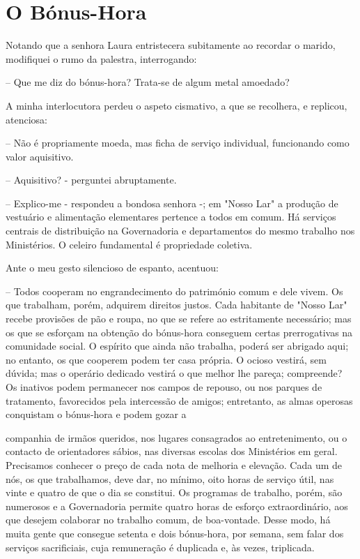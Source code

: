 \documentclass[portuguese,12pt,a4paper]{scrbook}
\begin{document}
	
	\chapter{O Bónus-Hora}
	
	Notando que a senhora Laura entristecera subitamente ao recordar o marido, modifiquei o rumo da palestra, interrogando:
	
	– Que me diz do bónus-hora? Trata-se de algum metal amoedado?
	
	A minha interlocutora perdeu o aspeto cismativo, a que se recolhera, e replicou, atenciosa:
	
	– Não é propriamente moeda, mas ficha de serviço individual, funcionando como valor aquisitivo.
	
	– Aquisitivo? - perguntei abruptamente.
	
	– Explico-me - respondeu a bondosa senhora -; em "Nosso Lar" a produção de vestuário e alimentação elementares pertence a todos em comum. Há serviços centrais de distribuição na Governadoria e departamentos do mesmo trabalho nos Ministérios. O celeiro fundamental é propriedade coletiva.
	
	Ante o meu gesto silencioso de espanto, acentuou:
	
	– Todos cooperam no engrandecimento do património comum e dele vivem. Os que trabalham, porém, adquirem direitos justos. Cada habitante de "Nosso Lar" recebe provisões de pão e roupa, no que se refere ao estritamente necessário; mas os que se esforçam na obtenção do bónus-hora conseguem certas prerrogativas na comunidade social. O espírito que ainda não trabalha, poderá ser abrigado aqui; no entanto, os que cooperem podem ter casa própria. O ocioso vestirá, sem dúvida; mas o operário dedicado vestirá o que melhor lhe pareça; compreende? Os inativos podem permanecer nos campos de repouso, ou nos parques de tratamento, favorecidos pela intercessão de amigos; entretanto, as almas operosas conquistam o bónus-hora e podem gozar a
	
	
	companhia de irmãos queridos, nos lugares consagrados ao entretenimento, ou o contacto de orientadores sábios, nas diversas escolas dos Ministérios em geral. Precisamos conhecer o preço de cada nota de melhoria e elevação. Cada um de nós, os que trabalhamos, deve dar, no mínimo, oito horas de serviço útil, nas vinte e quatro de que o dia se constitui. Os programas de trabalho, porém, são numerosos e a Governadoria permite quatro horas de esforço extraordinário, aos que desejem colaborar no trabalho comum, de boa-vontade. Desse modo, há muita gente que consegue setenta e dois bónus-hora, por semana, sem falar dos serviços sacrificiais, cuja remuneração é duplicada e, às vezes, triplicada.
	
\end{document}
